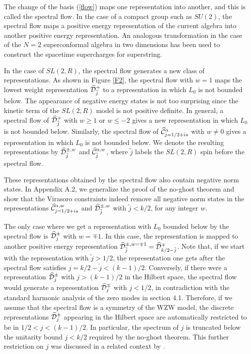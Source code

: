 The change of the basis (\ref{flow}) maps one representation
into another, and this is called the spectral flow.
In the case of a compact group such as $SU(2)$, the spectral
flow maps a positive energy representation 
of the current algebra into another positive energy 
representation. An analogous transformation in the case
of the $N=2$ superconformal algebra in two dimensions
has been used to construct the spacetime supercharges
for superstring. 

In the case of $SL(2,R)$, the spectral flow generates
a new class of representations.
As shown in Figure \ref{F2},
the spectral flow with $w=1$ maps the lowest weight
representation $\widehat{\cal D}_{\tilde{j}}^+$ to a representation
in which $L_0$ is not bounded  below. The appearance
of negative energy states is not too surprising since the kinetic
term of the $SL(2,R)$ model is not positive definite. 
In general, a spectral flow of $\widehat{\cal D}_{\tilde{j}}^+$
with $w\geq 1$ or $w \leq -2$ gives a new representation
in which $L_0$ is not bounded below.  
Similarly, the spectral flow of $\widehat{\cal C}_{j=1/2+is}^\alpha$
with $w \neq 0$ gives a representation in which $L_0$
is not bounded below. 
We denote the resulting representations by $\widehat{\cal D}^{\pm
,w}_{\tilde j}$ and $\widehat {\cal C}^{\alpha, w}_{\tilde j}$, where
$\tilde j$ labels the $SL(2,R)$ spin before the spectral flow. 


These representations obtained by the spectral flow also
contain negative norm states. 
In Appendix A.2, we generalize the proof of the no-ghost theorem
and show that the Virasoro constraints indeed remove all
negative norm states in 
the representations $\widehat{\cal C}_{j=1/2 + i s}^{\alpha, w}$
and $\widehat{\cal D}_{\tilde j}^{\pm , w}$ with $\tilde j < k/2$,
for any integer $w$. 

The only case where we get a representation with $L_0$ bounded below
by the spectral flow is 
$\widehat{\cal D}_j^\pm$ with $w=\mp 1$. In this case, 
the representation is mapped to another positive energy
representation $\widehat{\cal D}^{\pm,w=\mp 1}_{\tilde j} =
\widehat{\cal D}_{k/2-\tilde{j}}^\mp$.
Note that, if we start with
the representation with $\tilde{j} > 1/2$, the representation
one gets after the spectral flow satisfies 
$j = k/2 - \tilde{j} < (k-1)/2$.
Conversely, if there were a representation $\widehat{\cal D}_j^\pm$
with $j > (k-1)/2$ in the Hilbert space, the spectral flow would
generate a representation $\widehat{\cal D}_j^\mp$ with
$j < 1/2$, in contradiction with the standard harmonic analysis
of the zero modes in section 4.1.
Therefore, if we assume that the spectral flow
is a symmetry of the WZW model,
the discrete representations $\widehat {\cal D}_j^\pm$ appearing
in the Hilbert space are automatically 
restricted to be in $1/2 < j < (k-1)/2$. In particular, 
the spectrum of $j$ is truncated below 
the unitarity bound $j < k/2$ required by the no-ghost 
theorem. This further restriction on $j$  was discussed in a related
context by \cite{Giveon:1999px}.


